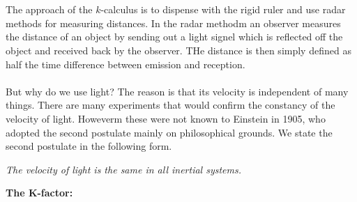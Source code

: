 \documentclass[10pt,a4paper,twocolumn]{article}
\newcounter{def}
\begin{document}
                \\
                \\
                \indent The approach of the $k$-calculus is to dispense with the rigid ruler and use radar methods for measuring distances. In the radar methodm an observer measures the distance of an object by sending out a light signel which is reflected off the object and received back by the observer. THe distance is then simply defined as half the time difference between emission and reception. 
                \\
                \\
                \indent But why do we use light? The reason is that its velocity is independent of many things. There are many experiments that would confirm the constancy of the velocity of light. Howeverm these were not known to Einstein in 1905, who adopted the second postulate mainly on philosophical grounds. We state the second postulate in the following form.
                \begin{definition}
                    \textit{The velocity of light is the same in all inertial systems.}
                \end{definition}
                \textbf{The K-factor:}
\end{document}

